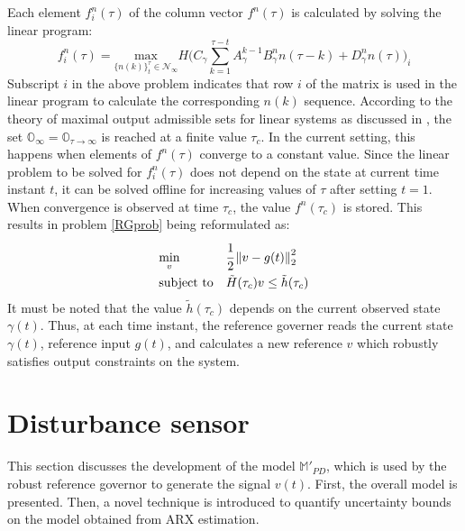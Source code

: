 \documentclass[letterpaper, 10 pt, conference]{ieeeconf}  %
\newcommand{\norm}[1]{\left\lVert#1\right\rVert}
\begin{document}
	Each element $f^n_i(\tau)$ of the column vector $f^n(\tau)$ is calculated by solving the linear program:
	\begin{equation}
	f_i^n(\tau) = \underset{\{n(k)\}_{t}^{\tau}\in \mathcal{N}_{\infty}}{\text{max}} H\bigg(C_{\gamma}\sum\limits_{k=1}^{\tau - t}A_{\gamma}^{k-1}B^n_{\gamma}n(\tau-k) + D_{\gamma}^n n(\tau)\bigg)_i
	\label{RG_offline}
	\end{equation}
	Subscript $i$ in the above problem indicates that row $i$ of the matrix is used in the linear program to calculate the corresponding $n(k)$ sequence. According to the theory of maximal output admissible sets for linear systems as discussed in \cite{83532}, the set $\mathbb{O}_{\infty} = \mathbb{O}_{\tau \to \infty}$ is reached at a finite value $\tau_c$. In the current setting, this happens when elements of $f^n(\tau)$ converge to a constant value. Since the linear problem to be solved for $f_i^n(\tau)$ does not depend on the state at current time instant $t$, it can be solved offline for increasing values of $\tau$ after setting $t=1$. When convergence is observed at time $\tau_c$, the value $f^n(\tau_c)$ is stored. This results in  problem \eqref{RGprob} being reformulated as:
	\begin{equation}
	\begin{aligned}
	& \underset{v}{\text{min}}
	& & \cfrac{1}{2}\norm{v-g(t)}_2^2 \\
	& \text{subject to}
	& & 
	\tilde{H}(\tau_c)v \leq \tilde{h}(\tau_c)
	\end{aligned}
	\label{RGprob_simple}
	\end{equation}
	It must be noted that the value $\tilde{h}(\tau_c)$ depends on the current observed state $\gamma(t)$. Thus, at each time instant, the reference governer reads the current state $\gamma(t)$, reference input $g(t)$, and calculates a new reference $v$ which robustly satisfies output constraints on the system.
	\section{Disturbance sensor}
	\label{Contribution}
	This section discusses the development of the model $\mathbb{M}'_{PD}$, which is used by the robust reference governor to generate the signal $v(t)$. First, the overall model is presented. Then, a novel technique is introduced to quantify uncertainty bounds on the model obtained from ARX estimation.
\end{document}
